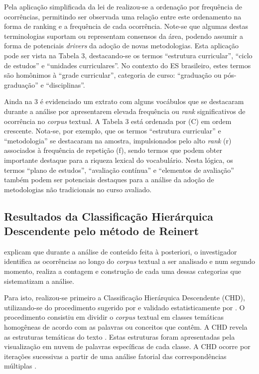 \documentclass{textolivre}
\begin{document}
Pela aplicação simplificada da lei de \textcite{zipf1949} realizou-se a ordenação por frequência de ocorrências, permitindo ser observada uma relação entre este ordenamento na forma de ranking e a frequência de cada ocorrência. Note-se que algumas destas terminologias suportam ou representam consensos da área, podendo assumir a forma de potenciais \textit{drivers} da adoção de novas metodologias. Esta aplicação pode ser vista na Tabela 3, destacando-se os termos “estrutura curricular”, “ciclo de estudos” e “unidades curriculares”. No contexto do ES brasileiro, estes termos são homônimos à “grade curricular”, categoria de curso: “graduação ou pós-graduação” e “disciplinas”.

Ainda na  3 é evidenciado um extrato com alguns vocábulos que se destacaram durante a análise por apresentarem elevada frequência ou \textit{rank} significativos de ocorrência no \textit{corpus} textual. A Tabela 3 está ordenada por (C) em ordem crescente. Nota-se, por exemplo, que os termos “estrutura curricular” e “metodologia” se destacaram na amostra, impulsionados pelo alto \textit{rank} (r) associados à frequência de repetição (f), sendo termos que podem obter importante destaque para a riqueza lexical do vocabulário. Nesta lógica, os termos “plano de estudos”, “avaliação contínua” e “elementos de avaliação” também podem ser potenciais destaques para a análise da adoção de metodologias não tradicionais no curso avaliado.

\subsection{Resultados da Classificação Hierárquica Descendente pelo método de Reinert}\label{sec-classificacao}
\textcite{lebart1994}explicam que durante a análise de conteúdo feita à posteriori, o investigador identifica as ocorrências ao longo do \textit{corpus} textual a ser analisado e num segundo momento, realiza a contagem e construção de cada uma dessas categorias que sistematizam a análise.

Para isto, realizou-se primeiro a Classificação Hierárquica Descendente (CHD), utilizando-se do procedimento sugerido por \textcite{reinert1990} e validado estatisticamente por \textcite{benzecri2007}. O procedimento consistiu em dividir o \textit{corpus} textual em classes temáticas homogêneas de acordo com as palavras ou conceitos que contêm. A CHD revela as estruturas temáticas do texto \cite{reinert1990}. Estas estruturas foram apresentadas pela visualização em nuvem de palavras específicas de cada classe. A CHD ocorre por iterações sucessivas a partir de uma análise fatorial das correspondências múltiplas \cite{benzecri2007}.
\end{document}
